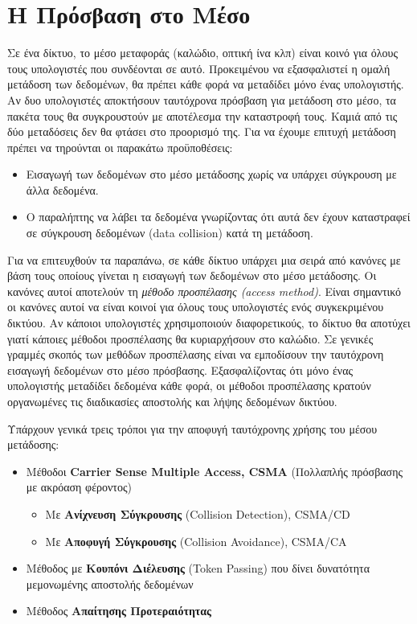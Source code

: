 %
%
\section{Η Πρόσβαση στο Μέσο}

Σε ένα δίκτυο, το μέσο μεταφοράς (καλώδιο, οπτική ίνα κλπ) είναι κοινό για όλους τους υπολογιστές που συνδέονται σε αυτό. Προκειμένου να εξασφαλιστεί η ομαλή μετάδοση των δεδομένων, θα πρέπει κάθε φορά να μεταδίδει μόνο ένας υπολογιστής. Αν δυο υπολογιστές αποκτήσουν ταυτόχρονα πρόσβαση για μετάδοση στο μέσο, τα πακέτα τους θα συγκρουστούν με αποτέλεσμα την καταστροφή τους. Καμιά από τις δύο μεταδόσεις δεν θα φτάσει στο προορισμό της. Για να έχουμε επιτυχή μετάδοση πρέπει να τηρούνται οι παρακάτω προϋποθέσεις:\\

\begin{itemize}
\item Εισαγωγή των δεδομένων στο μέσο μετάδοσης χωρίς να υπάρχει σύγκρουση με άλλα δεδομένα.
\item Ο παραλήπτης να λάβει τα δεδομένα γνωρίζοντας ότι αυτά δεν έχουν καταστραφεί σε σύγκρουση δεδομένων (data collision) κατά τη μετάδοση.
\end{itemize}

Για να επιτευχθούν τα παραπάνω, σε κάθε δίκτυο υπάρχει μια σειρά από κανόνες με βάση τους οποίους γίνεται η εισαγωγή των δεδομένων στο μέσο μετάδοσης. Οι κανόνες αυτοί αποτελούν τη \emph{μέθοδο προσπέλασης (access method)}. Είναι σημαντικό οι κανόνες αυτοί να είναι κοινοί για όλους τους υπολογιστές ενός συγκεκριμένου δικτύου. Αν κάποιοι υπολογιστές χρησιμοποιούν διαφορετικούς, το δίκτυο θα αποτύχει γιατί κάποιες μέθοδοι προσπέλασης θα κυριαρχήσουν στο καλώδιο. Σε γενικές γραμμές σκοπός των μεθόδων προσπέλασης είναι να εμποδίσουν την ταυτόχρονη εισαγωγή δεδομένων στο μέσο πρόσβασης. Εξασφαλίζοντας ότι μόνο ένας υπολογιστής μεταδίδει δεδομένα κάθε φορά, οι μέθοδοι προσπέλασης κρατούν οργανωμένες τις διαδικασίες αποστολής και λήψης δεδομένων δικτύου.

Υπάρχουν γενικά τρεις τρόποι για την αποφυγή ταυτόχρονης χρήσης του μέσου μετάδοσης:

\begin{itemize}
\item Μέθοδοι \textbf{Carrier Sense Multiple Access, CSMA} (Πολλαπλής πρόσβασης με ακρόαση φέροντος)
  \begin{itemize}
    \item Με \textbf{Ανίχνευση Σύγκρουσης} (Collision Detection), CSMA/CD
    \item Με \textbf{Αποφυγή Σύγκρουσης} (Collision Avoidance), CSMA/CA
  \end{itemize}
\item Μέθοδος με \textbf{Κουπόνι Διέλευσης} (Token Passing) που δίνει δυνατότητα μεμονωμένης αποστολής δεδομένων
\item Μέθοδος \textbf{Απαίτησης Προτεραιότητας}
\end{itemize}


